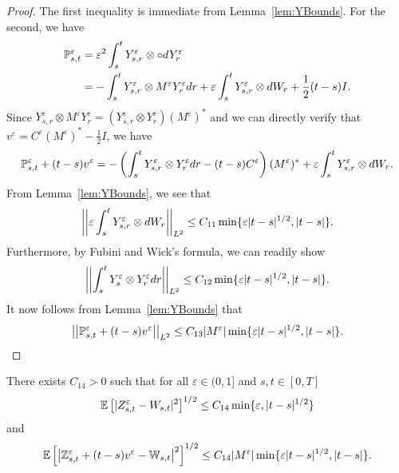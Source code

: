 \documentclass{article}
\begin{document}
\begin{proof}
The first inequality is immediate from Lemma~\ref{lem:YBounds}. For the second, we have
\begin{align*}
\Pbb^\varepsilon_{s,t} &= \varepsilon^2 \int_s^t Y^\varepsilon_{s,r} \otimes \circ dY^\varepsilon_r \\
&= -\int_s^t Y^\varepsilon_{s,r} \otimes M^\varepsilon Y^\varepsilon_r dr + \varepsilon\int_s^t Y^\varepsilon_{s,r}\otimes dW_r + \frac{1}{2}(t-s)I.
\end{align*}
Since $Y^\varepsilon_{s,r} \otimes M^\varepsilon Y^\varepsilon_r = (Y^\varepsilon_{s,r} \otimes Y^\varepsilon_r)(M^\varepsilon)^*$ and we can directly verify that $v^\varepsilon = C^\varepsilon(M^\varepsilon)^* - \frac{1}{2}I$, we have
\[
\Pbb^\varepsilon_{s,t} + (t-s)v^\varepsilon = -\left(\int_s^t Y^\varepsilon_{s,r} \otimes Y^\varepsilon_r dr - (t-s)C^\varepsilon\right) (M^\varepsilon)^* + \varepsilon \int_s^t Y^\varepsilon_{s,r} \otimes dW_r.
\]
From Lemma~\ref{lem:YBounds}, we see that
\[
\norm{\varepsilon \int_s^t Y^\varepsilon_{s,r} \otimes dW_r}_{L^2} \leq C_{11}\min\{\varepsilon|t-s|^{1/2},|t-s|\}.
\]
Furthermore, by Fubini and Wick's formula, we can readily show
\[
\norm{\int_s^t Y^\varepsilon_s \otimes Y^\varepsilon_r dr}_{L^2} \leq C_{12} \min\{\varepsilon |t-s|^{1/2}, |t-s|\}.
\]
It now follows from Lemma~\ref{lem:YBounds} that
\[
\norm{\Pbb^\varepsilon_{s,t} + (t-s)v^\varepsilon}_{L^2} \leq  C_{13} |M^\varepsilon| \min\{\varepsilon |t-s|^{1/2}, |t-s|\}.
\]
\end{proof}

\begin{lemma}\label{lem:ZBounds}
There exists $C_{14} > 0$ such that for all $\varepsilon \in (0,1]$ and $s,t \in [0,T]$
\[
\EEE{|Z^\varepsilon_{s,t} - W_{s,t}|^2}^{1/2} \leq C_{14} \min\{\varepsilon, |t-s|^{1/2}\}
\]
and
\[
\EEE{\left|\Z^\varepsilon_{s,t} + (t-s)v^\varepsilon - \W_{s,t}\right|^2}^{1/2} \leq C_{14} |M^\varepsilon| \min\{\varepsilon |t-s|^{1/2}, |t-s|\}.
\]
\end{lemma}
\end{document}
